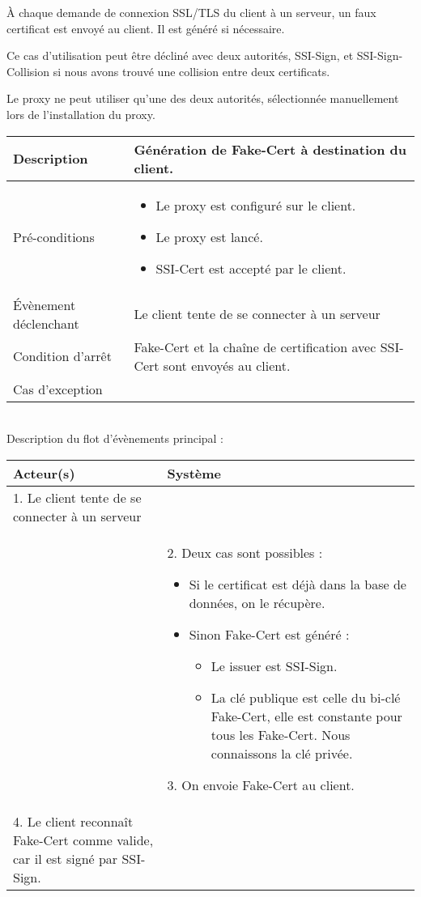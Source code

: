 À chaque demande de connexion SSL/TLS du client à un serveur, un faux certificat est envoyé au client. Il est généré si nécessaire.

Ce cas d'utilisation peut être décliné avec deux autorités, SSI-Sign, et SSI-Sign-Collision si nous avons trouvé une collision entre deux certificats.

Le proxy ne peut utiliser qu'une des deux autorités, sélectionnée manuellement lors de l'installation du proxy.

\begin{tabular}{|>{\columncolor[gray]{.8}}m{4cm}|m{12cm}|}
   \hline
   Description & Génération de Fake-Cert à destination du client. \\
   \hline
   Pré-conditions & \begin{itemize}
\item Le proxy est configuré sur le client.
\item Le proxy est lancé.
\item SSI-Cert est accepté par le client.
   \end{itemize}
 \\
   \hline
   Évènement déclenchant & Le client tente de se connecter à un serveur \\
   \hline
   Condition d'arrêt &  Fake-Cert et la chaîne de certification avec SSI-Cert sont envoyés au client. \\
   \hline
   Cas d'exception  &
\\
   \hline   
\end{tabular}

~\\

Description du flot d'évènements principal :

\begin{tabular}{|m{8cm}|m{8cm}|}
   \hline
  \rowcolor[gray]{.8} Acteur(s) & Système \\
   \hline
   1. Le client tente de se connecter à un serveur & \\
   \hline
    & 
2. 
Deux cas sont possibles :
\begin{itemize}
\item Si le certificat est déjà dans la base de données, on le récupère.
\item Sinon Fake-Cert est généré :
\begin{itemize}
\item Le issuer est SSI-Sign.
\item La clé publique est celle du bi-clé Fake-Cert, elle est constante pour tous les Fake-Cert. Nous connaissons la clé privée.
\end{itemize}
\end{itemize}
3. On envoie Fake-Cert au client. \\
   \hline
   4. Le client reconnaît Fake-Cert comme valide, car il est signé par SSI-Sign. &  \\
   \hline
\end{tabular}